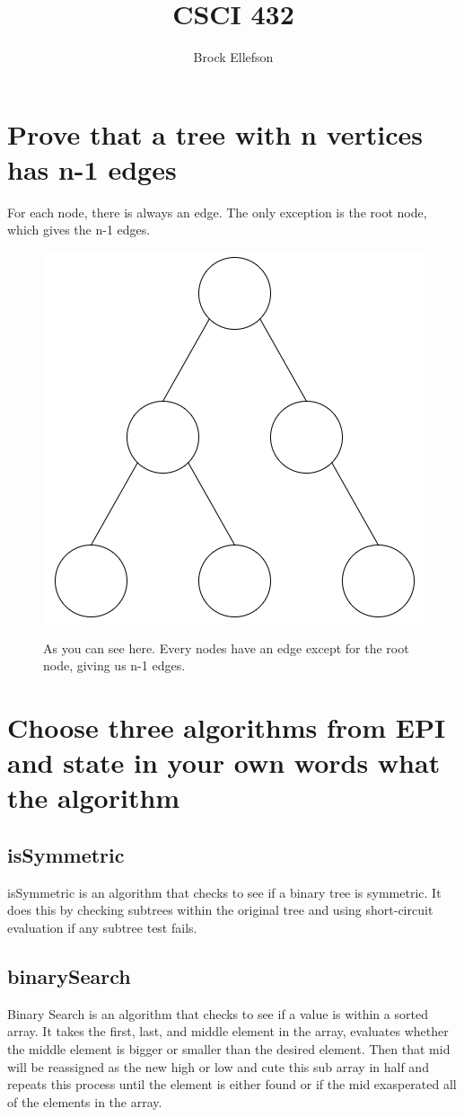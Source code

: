\documentclass[10pt,letterpaper]{article}
\author{Brock Ellefson}
\title{CSCI 432}
\begin{document}
\maketitle
\section{Prove that a tree with n vertices has n-1 edges}
For each node, there is always an edge. The only exception is the root node, which gives the n-1 edges.
	\begin{figure}[h]
	    \caption{As you can see here. Every nodes have an edge except for the root node, giving us n-1 edges.}
		\includegraphics[scale = .25]{CSCI432HW1TreeExample.png}
  		\label{fig:PCP}
	\end{figure}
\section{Choose three algorithms from EPI and state in your own words what the algorithm}	
	\subsection*{isSymmetric}
		isSymmetric is an algorithm that checks to see if a binary tree is symmetric. It does this by checking subtrees within the original tree and using short-circuit evaluation if any subtree test fails.
	\subsection*{binarySearch} 
		Binary Search is an algorithm that checks to see if a value is within a sorted array. It takes the first, last, and middle element in the array, evaluates whether the middle element is bigger or smaller than the desired element. Then that mid will be reassigned as the new high or low and cute this sub array in half and repeats this process until the element is either found or if the mid exasperated all of the elements in the array.
\end{document}
